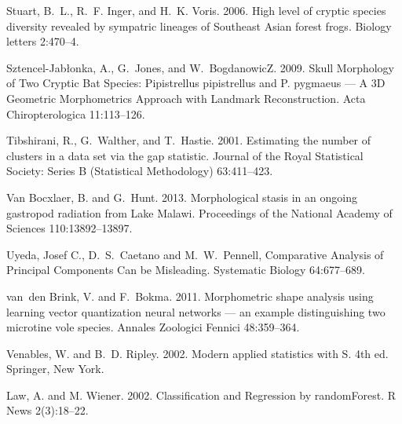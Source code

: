 \documentclass[12pt,letterpaper]{article}
\begin{document}
\begin{thebibliography}{77}
    Stuart, B.~L., R.~F. Inger, and H.~K. Voris. 2006. {High level of cryptic
      species diversity revealed by sympatric lineages of Southeast Asian forest
    frogs.} Biology letters 2:470--4.

    Sztencel-Jabłonka, A., G.~Jones, and W.~BogdanowicZ. 2009. {Skull Morphology
      of Two Cryptic Bat Species: Pipistrellus pipistrellus and P. pygmaeus — A
    3D Geometric Morphometrics Approach with Landmark Reconstruction}. Acta
    Chiropterologica 11:113--126.

    Tibshirani, R., G.~Walther, and T.~Hastie. 2001. {Estimating the number of
    clusters in a data set via the gap statistic}. Journal of the Royal
    Statistical Society: Series B (Statistical Methodology) 63:411--423.

    {Van Bocxlaer}, B. and G.~Hunt. 2013. {Morphological stasis in an ongoing
    gastropod radiation from Lake Malawi}. Proceedings of the National Academy of
    Sciences 110:13892--13897.
    
    Uyeda, Josef C., D.~S.~Caetano and M.~W.~Pennell, {Comparative Analysis of 
    Principal Components Can be Misleading}. Systematic Biology 64:677--689.
    

    van~den Brink, V. and F.~Bokma. 2011. {Morphometric shape analysis using
      learning vector quantization neural networks — an example distinguishing
    two microtine vole species}. Annales Zoologici Fennici 48:359--364.

    Venables, W. and B.~D. Ripley. 2002. {Modern applied statistics with S}. 4th
    ed. Springer, New York.

    Law, A. and M. Wiener. 2002. {Classification and Regression by randomForest.} 
    R News 2(3):18--22.
    

\end{thebibliography}
\end{document}
